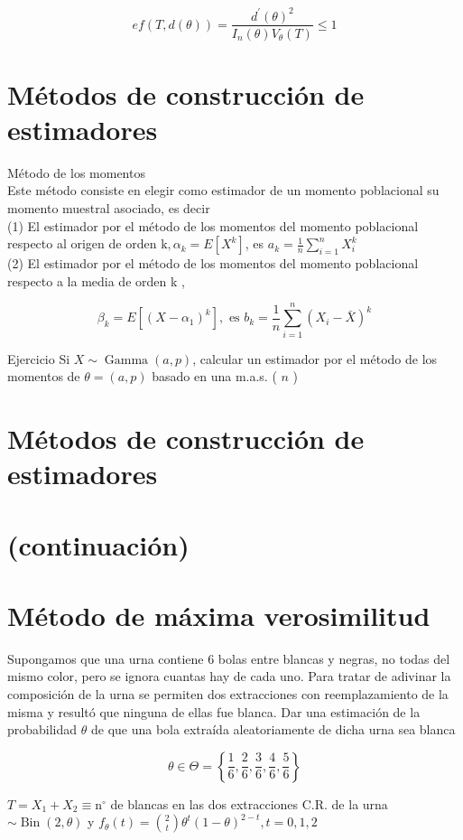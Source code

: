 $$
  e f(T, d(\theta))=\frac{d^{\prime}(\theta)^{2}}{I_{n}(\theta) V_{\theta}(T)} \leq 1
$$

\section*{Métodos de construcción de estimadores}
Método de los momentos\\
Este método consiste en elegir como estimador de un momento poblacional su momento muestral asociado, es decir\\
(1) El estimador por el método de los momentos del momento poblacional respecto al origen de orden $\mathrm{k}, \alpha_{k}=E\left[X^{k}\right]$, es $a_{k}=\frac{1}{n} \sum_{i=1}^{n} X_{i}^{k}$\\
(2) El estimador por el método de los momentos del momento poblacional respecto a la media de orden k ,

$$
  \beta_{k}=E\left[\left(X-\alpha_{1}\right)^{k}\right], \text { es } b_{k}=\frac{1}{n} \sum_{i=1}^{n}\left(X_{i}-\bar{X}\right)^{k}
$$

Ejercicio Si $X \sim \operatorname{Gamma}(a, p)$, calcular un estimador por el método de los momentos de $\theta=(a, p)$ basado en una m.a.s. ( $n$ )

\section*{Métodos de construcción de estimadores}
\section*{(continuación)}
\section*{Método de máxima verosimilitud}
Supongamos que una urna contiene 6 bolas entre blancas y negras, no todas del mismo color, pero se ignora cuantas hay de cada uno. Para tratar de adivinar la composición de la urna se permiten dos extracciones con reemplazamiento de la misma y resultó que ninguna de ellas fue blanca. Dar una estimación de la probabilidad $\theta$ de que una bola extraída aleatoriamente de dicha urna sea blanca

$$
  \theta \in \Theta=\left\{\frac{1}{6}, \frac{2}{6}, \frac{3}{6}, \frac{4}{6}, \frac{5}{6}\right\}
$$

$T=X_{1}+X_{2} \equiv \mathrm{n}^{\circ}$ de blancas en las dos extracciones C.R. de la urna $\sim \operatorname{Bin}(2, \theta)$ y $f_{\theta}(t)=\binom{2}{t} \theta^{t}(1-\theta)^{2-t}, t=0,1,2$

